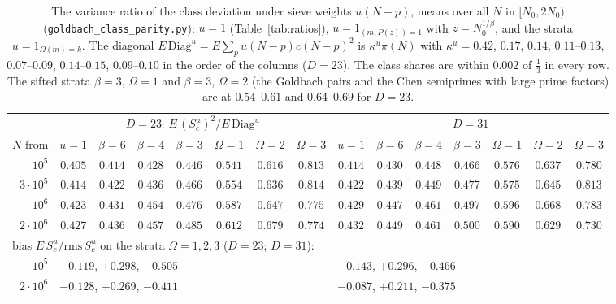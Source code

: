 ﻿\documentclass[11pt]{amsart}
\theoremstyle{remark}
\begin{document}
\begin{table}[htbp]
\centering\footnotesize\setlength{\tabcolsep}{3.2pt}
\begin{tabular}{r|ccccccc|ccccccc}
\toprule
& \multicolumn{7}{c|}{$D=23$: $E\,(S^u_c)^2/E\,\mathrm{Diag}^u$} & \multicolumn{7}{c}{$D=31$}\\
$N$ from & $u=1$ & $\beta=6$ & $\beta=4$ & $\beta=3$ & $\Omega=1$ & $\Omega=2$ & $\Omega=3$ & $u=1$ & $\beta=6$ & $\beta=4$ & $\beta=3$ & $\Omega=1$ & $\Omega=2$ & $\Omega=3$\\
\midrule
$10^5$ & $0.405$ & $0.414$ & $0.428$ & $0.446$ & $0.541$ & $0.616$ & $0.813$ & $0.414$ & $0.430$ & $0.448$ & $0.466$ & $0.576$ & $0.637$ & $0.780$\\
$3\cdot10^5$ & $0.414$ & $0.422$ & $0.436$ & $0.466$ & $0.554$ & $0.636$ & $0.814$ & $0.422$ & $0.439$ & $0.449$ & $0.477$ & $0.575$ & $0.645$ & $0.813$\\
$10^6$ & $0.423$ & $0.431$ & $0.454$ & $0.476$ & $0.587$ & $0.647$ & $0.775$ & $0.429$ & $0.447$ & $0.461$ & $0.497$ & $0.596$ & $0.668$ & $0.783$\\
$2\cdot10^6$ & $0.427$ & $0.436$ & $0.457$ & $0.485$ & $0.612$ & $0.679$ & $0.774$ & $0.432$ & $0.449$ & $0.461$ & $0.500$ & $0.590$ & $0.629$ & $0.730$\\
\midrule
\multicolumn{15}{l}{bias $E\,S^u_c/\mathrm{rms}\,S^u_c$ on the strata $\Omega=1,2,3$ ($D=23$; $D=31$):}\\
$10^5$ & \multicolumn{7}{l|}{$-0.119$, $+0.298$, $-0.505$} & \multicolumn{7}{l}{$-0.143$, $+0.296$, $-0.466$}\\
$2\cdot10^6$ & \multicolumn{7}{l|}{$-0.128$, $+0.269$, $-0.411$} & \multicolumn{7}{l}{$-0.087$, $+0.211$, $-0.375$}\\
\bottomrule
\end{tabular}
\medskip
\caption{The variance ratio of the class deviation under sieve weights $u(N-p)$, means over all $N$ in $[N_0,2N_0)$ (\texttt{goldbach\_class\_parity.py}): $u=1$ (Table~\ref{tab:ratios}), $u=1_{(m,P(z))=1}$ with $z=N_0^{1/\beta}$, and the strata $u=1_{\Omega(m)=k}$. The diagonal $E\,\mathrm{Diag}^u=E\sum_pu(N-p)c(N-p)^2$ is $\kappa^u\pi(N)$ with $\kappa^u=0.42$, $0.17$, $0.14$, $0.11$--$0.13$, $0.07$--$0.09$, $0.14$--$0.15$, $0.09$--$0.10$ in the order of the columns ($D=23$). The class shares are within $0.002$ of $\frac13$ in every row. The sifted strata $\beta=3$, $\Omega=1$ and $\beta=3$, $\Omega=2$ (the Goldbach pairs and the Chen semiprimes with large prime factors) are at $0.54$--$0.61$ and $0.64$--$0.69$ for $D=23$.}
\label{tab:strata}
\end{table}
\end{document}
